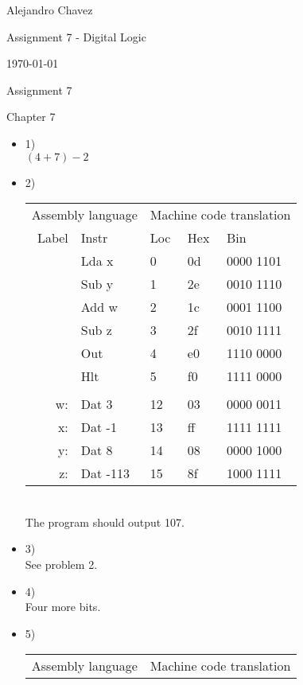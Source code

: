 \documentclass{article}
\begin{document}
\hfill Alejandro Chavez

\hfill Assignment 7 - Digital Logic

\hfill \today\\

\begin{center}\begin{large}Assignment 7\end{large}\end{center}	
Chapter 7
\begin{itemize}
  \item
    1)\\
    $(4+7)-2$
  \item
    2)\\
    \begin{tabular}{rl|lll}
    \multicolumn{2}{c}{Assembly language} & \multicolumn{3}{c}{Machine code translation} \\ 
    Label &    Instr & Loc & Hex & Bin \\ \hline
          &    Lda x &   0 &  0d & 0000 1101 \\
          &    Sub y &   1 &  2e & 0010 1110 \\
          &    Add w &   2 &  1c & 0001 1100 \\
          &    Sub z &   3 &  2f & 0010 1111 \\
          &      Out &   4 &  e0 & 1110 0000 \\
          &      Hlt &   5 &  f0 & 1111 0000 \\
          &          &     &     &           \\
       w: &    Dat 3 &  12 &  03 & 0000 0011 \\   
       x: &   Dat -1 &  13 &  ff & 1111 1111 \\
       y: &    Dat 8 &  14 &  08 & 0000 1000 \\
       z: & Dat -113 &  15 &  8f & 1000 1111 \\
    \end{tabular}\\
    The program should output 107.
  \item
    3)\\
    See problem 2.
  \item
    4)\\
    Four more bits.
  \item
    5)\\
    \begin{tabular}{rl|lll}
    \multicolumn{2}{c}{Assembly language} & \multicolumn{3}{c}{Machine code translation} \\ 

\end{tabular}
\end{itemize}
\end{document}
